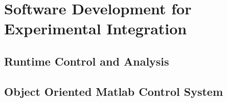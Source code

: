 

\chapter{Software Development for Experimental Integration}
\label{chap:SoftwareDevelopmentforExperimentalIntegration}


\section{Runtime Control and Analysis}
\label{sec:RuntimeControlandAnalysis}


\section{Object Oriented Matlab Control System}
\label{sec:ObjectOrientedMatlabControlSystem}


